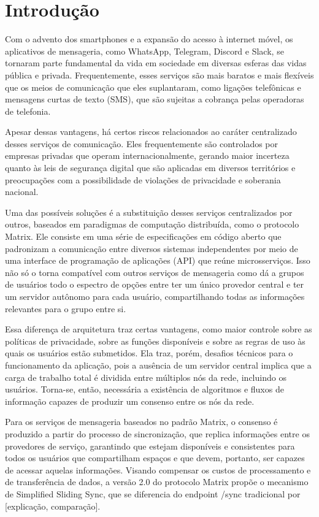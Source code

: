 \section{Introdução}\label{sec:introduction}
Com o advento dos smartphones e a expansão do acesso à internet móvel, os aplicativos de mensageria, como WhatsApp, Telegram, Discord e Slack, se tornaram parte fundamental da vida em sociedade em diversas esferas das vidas pública e privada. Frequentemente, esses serviços são mais baratos e mais flexíveis que os meios de comunicação que eles suplantaram, como ligações telefônicas e mensagens curtas de texto (SMS), que são sujeitas a cobrança pelas operadoras de telefonia.

Apesar dessas vantagens, há certos riscos relacionados ao caráter centralizado desses serviços de comunicação. Eles frequentemente são controlados por empresas privadas que operam internacionalmente, gerando maior incerteza quanto às leis de segurança digital que são aplicadas em diversos territórios e preocupações com a possibilidade de violações de privacidade e soberania nacional.

Uma das possíveis soluções é a substituição desses serviços centralizados por outros, baseados em paradigmas de computação distribuída, como o protocolo Matrix. Ele consiste em uma série de especificações em código aberto que padronizam a comunicação entre diversos sistemas independentes por meio de uma interface de programação de aplicações (API) que reúne microsserviços. Isso não só o torna compatível com outros serviços de mensageria como dá a grupos de usuários todo o espectro de opções entre ter um único provedor central e ter um servidor autônomo para cada usuário, compartilhando todas as informações relevantes para o grupo entre si.

Essa diferença de arquitetura traz certas vantagens, como maior controle sobre as políticas de privacidade, sobre as funções disponíveis e sobre as regras de uso às quais os usuários estão submetidos. Ela traz, porém, desafios técnicos para o funcionamento da aplicação, pois a ausência de um servidor central implica que a carga de trabalho total é dividida entre múltiplos nós da rede, incluindo os usuários. Torna-se, então, necessária a existência de algoritmos e fluxos de informação capazes de produzir um consenso entre os nós da rede.

Para os serviços de mensageria baseados no padrão Matrix, o consenso é produzido a partir do processo de sincronização, que replica informações entre os provedores de serviço, garantindo que estejam disponíveis e consistentes para todos os usuários que compartilham espaços e que devem, portanto, ser capazes de acessar aquelas informações. Visando compensar os custos de processamento e de transferência de dados, a versão 2.0 do protocolo Matrix propõe o mecanismo de Simplified Sliding Sync, que se diferencia do endpoint /sync tradicional por [explicação, comparação].

